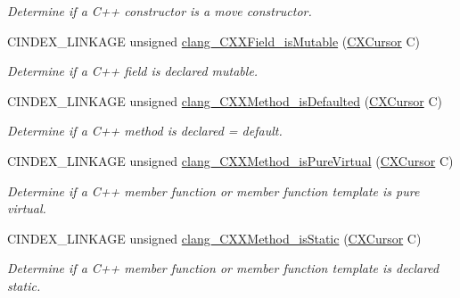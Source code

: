 \begin{DoxyCompactItemize}
\begin{DoxyCompactList}\small\item\em Determine if a C++ constructor is a move constructor. \end{DoxyCompactList}\item 
\mbox{\label{group__CINDEX__CPP_ga139bb12b60cd1ee472c6617f84691463}} 
C\+I\+N\+D\+E\+X\+\_\+\+L\+I\+N\+K\+A\+GE unsigned \hyperlink{group__CINDEX__CPP_ga139bb12b60cd1ee472c6617f84691463}{clang\+\_\+\+C\+X\+X\+Field\+\_\+is\+Mutable} (\hyperlink{structCXCursor}{C\+X\+Cursor} C)
\begin{DoxyCompactList}\small\item\em Determine if a C++ field is declared \textquotesingle{}mutable\textquotesingle{}. \end{DoxyCompactList}\item 
\mbox{\label{group__CINDEX__CPP_gaa9a2e7ae6d70db44f385ef1a0e49b4e5}} 
C\+I\+N\+D\+E\+X\+\_\+\+L\+I\+N\+K\+A\+GE unsigned \hyperlink{group__CINDEX__CPP_gaa9a2e7ae6d70db44f385ef1a0e49b4e5}{clang\+\_\+\+C\+X\+X\+Method\+\_\+is\+Defaulted} (\hyperlink{structCXCursor}{C\+X\+Cursor} C)
\begin{DoxyCompactList}\small\item\em Determine if a C++ method is declared \textquotesingle{}= default\textquotesingle{}. \end{DoxyCompactList}\item 
\mbox{\label{group__CINDEX__CPP_ga27e62c66c6dde438a114c4d6f93b5d9d}} 
C\+I\+N\+D\+E\+X\+\_\+\+L\+I\+N\+K\+A\+GE unsigned \hyperlink{group__CINDEX__CPP_ga27e62c66c6dde438a114c4d6f93b5d9d}{clang\+\_\+\+C\+X\+X\+Method\+\_\+is\+Pure\+Virtual} (\hyperlink{structCXCursor}{C\+X\+Cursor} C)
\begin{DoxyCompactList}\small\item\em Determine if a C++ member function or member function template is pure virtual. \end{DoxyCompactList}\item 
\mbox{\label{group__CINDEX__CPP_ga0362e1cf8957f59cc2803456ac2cbc45}} 
C\+I\+N\+D\+E\+X\+\_\+\+L\+I\+N\+K\+A\+GE unsigned \hyperlink{group__CINDEX__CPP_ga0362e1cf8957f59cc2803456ac2cbc45}{clang\+\_\+\+C\+X\+X\+Method\+\_\+is\+Static} (\hyperlink{structCXCursor}{C\+X\+Cursor} C)
\begin{DoxyCompactList}\small\item\em Determine if a C++ member function or member function template is declared \textquotesingle{}static\textquotesingle{}. \end{DoxyCompactList}\item 

\end{DoxyCompactItemize}
